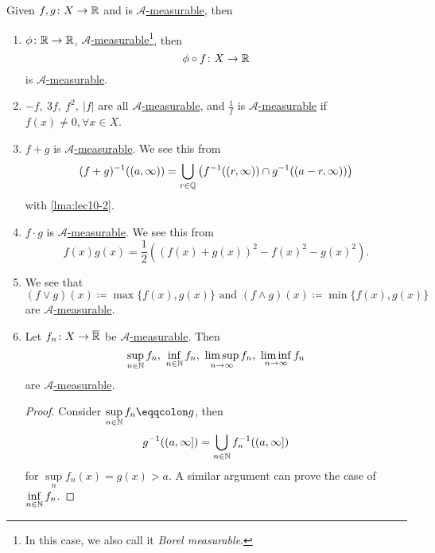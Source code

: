 \begin{remark}\label{rmk:Operations-preserve-measurability}
	Given \(f, g\colon X\to \mathbb{\MakeUppercase{r}} \) and is \hyperref[def:A-measurable-function]{\(\mathcal{A}\)-measurable}, then
	\begin{enumerate}
		\item \(\phi \colon \mathbb{\MakeUppercase{r}} \to \mathbb{\MakeUppercase{r}} \), \hyperref[def:A-measurable-function]{\(\mathcal{A}\)-measurable}\footnote{\label{def:Borel-measurable}In this case, we also call it \emph{Borel measurable}.}, then
		      \[
			      \phi \circ f\colon X\to \mathbb{\MakeUppercase{r}}
		      \]
		      is \hyperref[def:A-measurable-function]{\(\mathcal{A}\)-measurable}.
		\item \(-f,\ 3f,\ f^2,\ \left\vert f \right\vert \) are all \hyperref[def:A-measurable-function]{\(\mathcal{A} \)-measurable}, and \(\frac{1}{f}\) is
		      \hyperref[def:A-measurable-function]{\(\mathcal{A}\)-measurable} if \(f(x)\neq 0, \forall x\in X\).
		\item \(f+g\) is \hyperref[def:A-measurable-function]{\(\mathcal{A}\)-measurable}. We see this from
		      \[
			      (f+g)^{-1} ((a, \infty ))=\bigcup\limits_{r\in\mathbb{\MakeUppercase{q}}} \left(f^{-1} ((r, \infty ))\cap g^{-1} ((a-r, \infty ))\right)
		      \]
		      with \autoref{lma:lec10-2}.
		\item \(f\cdot g\) is \hyperref[def:A-measurable-function]{\(\mathcal{A}\)-measurable}. We see this from
		      \[
			      f(x)g(x) = \frac{1}{2}\left((f(x)+g(x))^2 - f(x)^2 - g(x)^2\right).
		      \]
		\item We see that
		      \[
			      (f\vee g)(x)\coloneqq \max \{f(x), g(x)\}\text{ and }(f\wedge g)(x)\coloneqq \min\{f(x), g(x)\}
		      \]
		      are \hyperref[def:A-measurable-function]{\(\mathcal{A}\)-measurable}.
		\item Let \(f_{n}\colon X\to \overline{\mathbb{\MakeUppercase{r}} }\) be \hyperref[def:A-measurable-function]{\(\mathcal{A}\)-measurable}. Then
		      \[
			      \sup\limits_{n\in\mathbb{\MakeUppercase{n}} } f_{n},\ \inf\limits_{n\in\mathbb{\MakeUppercase{n}} } f_{n},\ \limsup\limits_{n\to \infty} f_{n},\ \liminf\limits_{n\to \infty} f_{n}
		      \]
		      are \hyperref[def:A-measurable-function]{\(\mathcal{A}\)-measurable}.
		      \begin{proof}
			      Consider \(\sup\limits_{n\in\mathbb{\MakeUppercase{n}} } f_{n} \eqqcolon g\), then
			      \[
				      g^{-1} ((a, \infty ]) = \bigcup\limits_{n\in\mathbb{\MakeUppercase{n}}} f_{n}^{-1} ((a, \infty ])
			      \]
			      for \(\sup\limits_n f_{n}(x) = g(x)>a\). A similar argument can prove the case of \(\inf\limits_{n\in\mathbb{\MakeUppercase{n}} } f_{n}\).


\end{proof}
\end{enumerate}
\end{remark}

